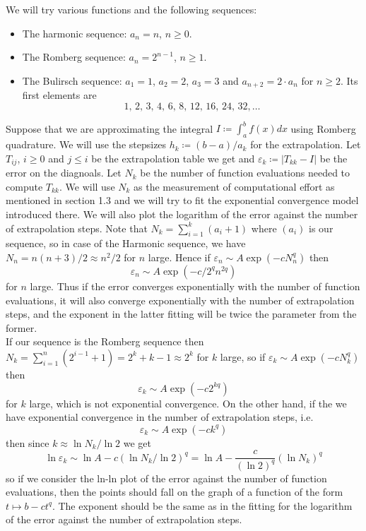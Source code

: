 We will try various functions and the following sequences:
\begin{itemize}
    \item The harmonic sequence: \(a_n = n\), \(n\geq 0\).
    \item The Romberg sequence: \(a_n = 2^{n-1}\), \(n\geq 1\).
    \item The Bulirsch sequence: \(a_1 = 1\), \(a_2 = 2\), \(a_3 = 3\) and \(a_{n+2} = 2\cdot a_n\) for \(n\geq 2\). Its first elements are 
    \[
    1,\, 2,\, 3,\, 4,\, 6,\, 8,\, 12,\, 16,\, 24,\, 32,\ldots
    \]
\end{itemize}
Suppose that we are approximating the integral \(I\coloneqq \int_a^b f(x)dx\) using Romberg quadrature. We will use the stepsizes \(h_k\coloneqq (b-a)/a_k\) for the extrapolation. Let \(T_{ij}\), \(i\geq 0\) and \(j\leq i\) be the extrapolation table we get and \(\varepsilon_k \coloneqq |T_{kk}-I|\) be the error on the diagnoals. Let \(N_k\) be the number of function evaluations needed to compute \(T_{kk}\). We will use \(N_k\) as the measurement of computational effort as mentioned in section 1.3 and we will try to fit the exponential convergence model introduced there. We will also plot the logarithm of the error against the number of extrapolation steps. Note that \(N_k = \sum_{i=1}^k(a_i + 1)\) where \((a_i)\) is our sequence, so in case of the Harmonic sequence, we have \(N_n = n(n+3)/2 \approx n^2/2\) for \(n\) large. Hence if \(\varepsilon_n \sim A\exp(-cN_n^q)\) then 
\[
\varepsilon_n \sim A\exp(-c/2^qn^{2q})
\]
for \(n\) large. Thus if the error converges exponentially with the number of function evaluations, it will also converge exponentially with the number of extrapolation steps, and the exponent in the latter fitting will be twice the parameter from the former.\\

If our sequence is the Romberg sequence then \(N_k = \sum_{i=1}^n (2^{i-1} + 1) = 2^k + k - 1 \approx 2^k\) for \(k\) large, so if \(\varepsilon_k\sim A \exp(-cN_k^q)\) then 
\[
\varepsilon_k \sim A\exp(-c 2^{kq}) 
\]
for \(k\) large, which is not exponential convergence. On the other hand, if the we have exponential convergence in the number of extrapolation steps, i.e.
\[
\varepsilon_k \sim A \exp(-c k^q)
\]
then since \(k \approx \ln N_k / \ln 2\) we get 
\[
\ln \varepsilon_k \sim \ln A - c (\ln N_k / \ln 2)^q = \ln A - \frac{c}{(\ln 2)^q} (\ln N_k)^q
\]
so if we consider the ln-ln plot of the error against the number of function evaluations, then the points should fall on the graph of a function of the form \(t\mapsto b - c t^q\). The exponent should be the same as in the fitting for the logarithm of the error against the number of extrapolation steps.\\

